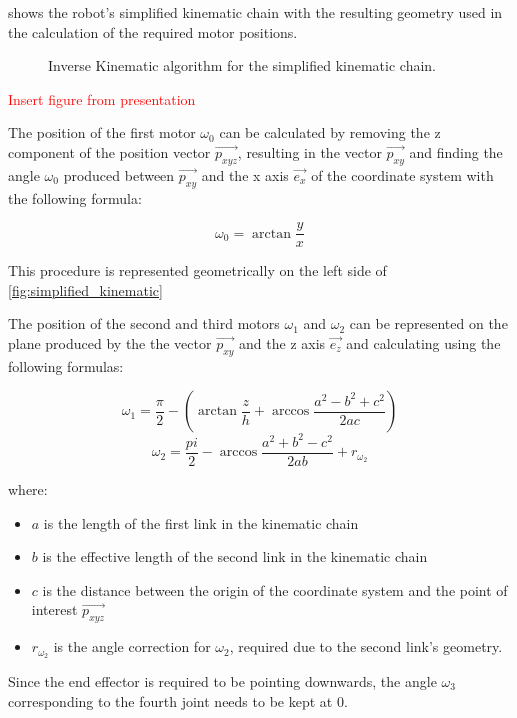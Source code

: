 


 


 shows the robot's simplified kinematic chain with the resulting geometry used in the calculation of the required motor positions.


\begin{figure}[!h]
    \centering
    \caption{Inverse Kinematic algorithm for the simplified kinematic chain.}
    \label{fig:simplified_kinematic}
\end{figure}

\textcolor{red}{Insert figure from presentation} %

The position of the first motor $\omega_0$ can be calculated by removing the z component of the position vector $\vec{p_{xyz}}$, resulting in the vector $\vec{p_{xy}}$ and finding the angle $\omega_0$ produced between $\vec{p_{xy}}$ and the x axis $\vec{e_x}$ of the coordinate system with the following formula:

$$\omega_0=\arctan{\frac{y}{x}}$$

This procedure is represented geometrically on the left side of \vref{fig:simplified_kinematic}

The position of the second and third motors $\omega_1$ and $\omega_2$ can be represented on the plane produced by the the vector $\vec{p_{xy}}$ and the z axis $\vec{e_z}$ and calculating using the following formulas:

$$\omega_1=\frac{\pi}{2} - (\arctan{\frac{z}{h}} + \arccos{\frac{a^2-b^2+c^2}{2ac}})$$
$$\omega_2 = \frac{pi}{2} - \arccos{\frac{a^2+b^2-c^2}{2ab}} + r_{\omega_2}$$


where:
\begin{itemize}
    \item $a$ is the length of the first link in the kinematic chain
    \item $b$ is the effective length of the second link in the kinematic chain
    \item $c$ is the distance between the origin of the coordinate system and the point of interest $\vec{p_{xyz}}$
    \item $r_{\omega_2}$ is the angle correction for $\omega_2$, required due to the second link's geometry.
\end{itemize}
Since the end effector is required to be pointing downwards, the angle $\omega_3$ corresponding to the fourth joint needs to be kept at 0.


